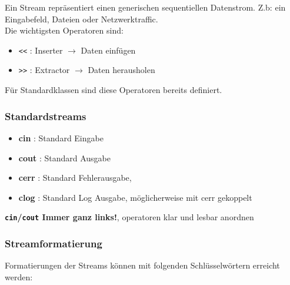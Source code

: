 Ein Stream repräsentiert einen generischen sequentiellen Datenstrom. 
Z.b: ein Eingabefeld, Dateien oder Netzwerktraffic.\\
Die wichtigsten Operatoren sind:

\begin{itemize}[itemsep=1pt, parsep=0pt]
    \item \verb|<<| : Inserter $\rightarrow$  Daten einfügen
    \item \verb|>>| :  Extractor $\rightarrow$ Daten herausholen
\end{itemize}

Für Standardklassen sind diese Operatoren bereits definiert.
\subsubsection*{Standardstreams}

\begin{itemize}[itemsep=1pt, parsep=0pt]
    \item \textbf{cin} : Standard Eingabe
    \item \textbf{cout} : Standard Ausgabe
    \item \textbf{cerr} : Standard Fehlerausgabe, 
    \item \textbf{clog} : Standard Log Ausgabe, möglicherweise mit cerr gekoppelt 
\end{itemize}\vspace{0.5em}

\textbf{\texttt{cin}/\texttt{cout} Immer ganz links!}, operatoren klar und lesbar anordnen

\subsubsection{Streamformatierung}

Formatierungen der Streams können mit folgenden Schlüsselwörtern erreicht werden:\vspace{-1em}

